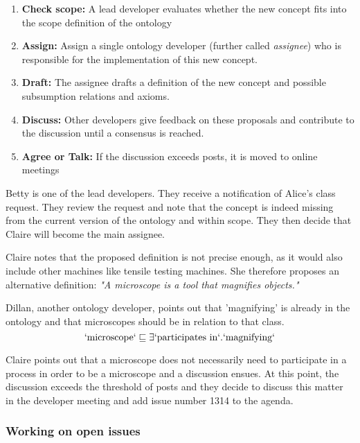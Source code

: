\begin{enumerate}
    \item \textbf{Check scope: } A lead developer evaluates whether the new concept fits into the scope definition of the ontology
    \item \textbf{Assign:} Assign a single ontology developer (further called \textit{assignee}) who is responsible for the implementation of this new concept.
    \item \textbf{Draft:} The assignee drafts a definition of the new concept and possible subsumption relations and axioms.
    \item \textbf{Discuss:} Other developers give feedback on these proposals and contribute to the discussion until a consensus is reached.
    \item \textbf{Agree or Talk:} If the discussion exceeds {\issuediscussionlimit} posts, it is moved to online meetings
\end{enumerate}


\begin{example}
    Betty is one of the lead developers. They receive a notification of Alice's class request. They review the request and note that the concept is indeed missing from the current version of the ontology and within scope. They then decide that Claire will become the main assignee.

    Claire notes that the proposed definition is not precise enough, as it would also include other machines like tensile testing machines. She therefore proposes an alternative definition: \textit{"A microscope is a tool that magnifies objects."}

    Dillan, another ontology developer, points out that 'magnifying' is already in the ontology and that microscopes should be in relation to that class. 
    \[\mathrm{`microscope`} \sqsubseteq \exists \mathrm{`participates~in`}.\mathrm{`magnifying`}\]

    Claire points out that a microscope does not necessarily need to participate in a process in order to be a microscope and a discussion ensues. At this point, the discussion exceeds the threshold of {\issuediscussionlimit} posts and they decide to discuss this matter in the developer meeting and add issue number 1314 to the agenda.
\end{example}

\subsubsection{Working on open issues}

